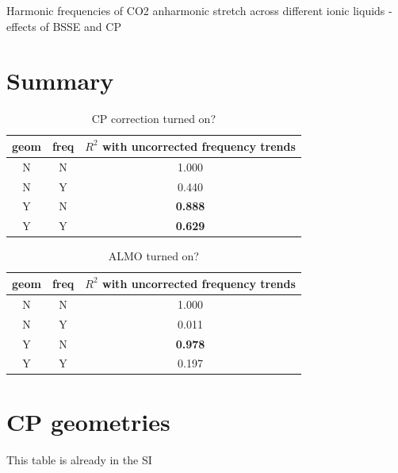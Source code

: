 \documentclass{article}
\begin{document}
Harmonic frequencies of CO2 anharmonic stretch across different ionic liquids - effects of BSSE and CP

\section{Summary}

\begin{table}
  \centering
  \caption{CP correction turned on?}
  \begin{tabular}{ccc}
    \toprule
    geom & freq & {\(R^2\) with uncorrected frequency trends} \\
    \midrule
    N & N & 1.000 \\
    N & Y & 0.440 \\
    Y & N & \textbf{0.888} \\
    Y & Y & \textbf{0.629} \\
    \bottomrule
  \end{tabular}
\end{table}

\begin{table}
  \centering
  \caption{ALMO turned on?}
  \begin{tabular}{ccc}
    \toprule
    geom & freq & {\(R^2\) with uncorrected frequency trends} \\
    \midrule
    N & N & 1.000 \\
    N & Y & 0.011 \\
    Y & N & \textbf{0.978} \\
    Y & Y & 0.197 \\
    \bottomrule
  \end{tabular}
\end{table}

\section{CP geometries}

This table is already in the SI
\end{document}
